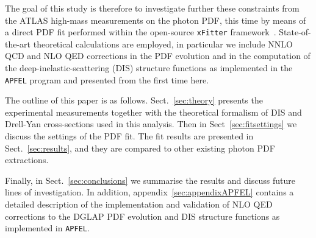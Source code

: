 The goal of this study is therefore to investigate further these
constraints from the ATLAS high-mass measurements on the photon PDF,
this time by means of a direct PDF fit performed within the
open-source {\tt xFitter} framework~\cite{Alekhin:2014irh}.
%
State-of-the-art theoretical calculations are employed, in particular
we include NNLO QCD and NLO QED corrections in the PDF evolution and
in the computation of the deep-inelastic-scattering (DIS) structure
functions as implemented in the {\tt APFEL} program and presented from
the first time here.
%


The outline of this paper is as follows.
%
Sect.~\ref{sec:theory} presents the experimental measurements together
with the theoretical formalism of DIS and Drell-Yan cross-sections
used in this analysis.
%
Then in Sect~\ref{sec:fitsettings} we discuss the settings of the PDF
fit.
%
%
The fit results are presented in Sect.~\ref{sec:results}, and they are
compared to other existing photon PDF extractions.

%
Finally, in Sect.~\ref{sec:conclusions} we summarise the results and
discuss future lines of investigation.
%
In addition, appendix~\ref{sec:appendixAPFEL} contains a detailed
description of the implementation and validation of NLO QED
corrections to the DGLAP PDF evolution and DIS structure functions as
implemented in {\tt APFEL}.
